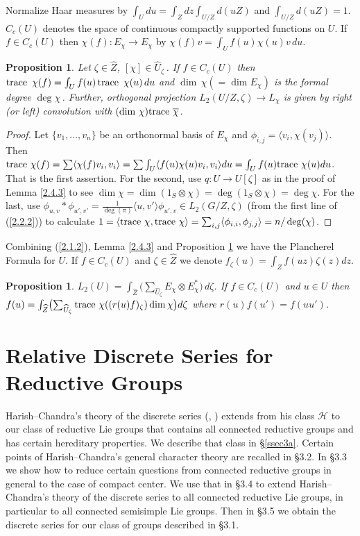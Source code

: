 \documentclass{conm-p-l}
\newtheorem{proposition}[equation]{Proposition}
\def\trace{{\rm trace\,\,}}
\def\cH{\mathcal{H}}
\begin{document}
Normalize Haar measures by
$\int_U du = \int_Z dz\int_{U/Z}d(uZ)$ and $\int_{U/Z} d(uZ) = 1$.
$C_c(U)$ denotes the space of continuous compactly supported functions on $U$.
If $f \in C_c(U)$ then $\chi(f):E_\chi \to E_\chi$ by
$\chi(f)v = \int_U f(u)\chi(u)v\, du$.  

\begin{proposition}\label{2.4.4}
Let $\zeta \in \widehat{Z}$, $[\chi] \in \widehat{U}_\zeta$\,.  If
$f \in C_c(U)$ then 
$\trace\,\chi(f) = \int_U f(u)\, \trace\,\chi(u)\,du$
and $\dim\,\chi (= \dim E_\chi)$ is the formal degree $\deg \chi$\,.
Further, orthogonal projection $L_2(U/Z,\zeta) \to L_\chi$ is given by right
(or left) convolution with $(\dim\,\chi)\trace\overline{\chi}$.
\end{proposition}
\begin{proof} Let $\{v_1,\dots,v_n\}$ be an orthonormal basis of $E_\chi$
and $\phi_{i,j} = \langle v_i,\chi(v_j)\rangle$.  Then $\trace \chi(f)
=\sum\langle \chi(f)v_i,v_i\rangle 
= \sum\int_U\langle f(u)\chi(u)v_i,v_i\rangle du 
= \int_U f(u)\trace \chi(u) du$.  That is the first assertion.  For the
second, use $q:U \to U[\zeta]$ as in the proof of Lemma \ref{2.4.3} to
see $\dim\chi = \dim(1_S\otimes\chi) = \deg(1_S\otimes\chi) = \deg\chi$.
For the last, use $\phi_{u,v}*\phi_{u',v'} = \frac{1}{\deg(\pi)}
\langle u, v' \rangle \phi_{u',v} \in L_2(G/Z,\zeta)$ (from the first line 
of (\ref{2.2.2})) to calculate $1 = \langle \trace\chi,\trace\chi\rangle
= \sum_{i,j}\langle \phi_{i,i}, \phi_{j,j}\rangle = n/\deg(\chi)$.
\end{proof}

Combining (\ref{2.1.2}), Lemma \ref{2.4.3} and Proposition \ref{2.4.4} we have
the Plancherel Formula for $U$.  If $f \in C_c(U)$ and $\zeta \in \widehat{Z}$
we denote $f_\zeta(u) = \int_Z f(uz)\zeta(z)dz$.

\begin{proposition}\label{2.4.5}
$L_2(U) = \int_{\widehat{Z}} \bigl ( \sum_{\widehat{U}_\zeta}
E_\chi \otimes E_\chi^* \bigr )\,d\zeta$.  If $f \in C_c(U)$ and $u \in U$
then $f(u) = \int_{\widehat{Z}} \bigl ( \sum_{\widehat{U}_\zeta}
\trace \chi((r(u)f)_\zeta) \dim\chi\bigr )d\zeta$ where $r(u)f(u') = f(uu')$.
\end{proposition}

\section{Relative Discrete Series for Reductive Groups}\label{sec3}
\setcounter{equation}{0}
Harish--Chandra's theory of the discrete series (\cite{HC1965}, \cite{HC1966})
extends from his class $\cH$ to our class of reductive Lie groups that 
contains all connected reductive groups and has certain hereditary properties.
We describe that class in \S \ref{ssec3a}.  Certain points of Harish--Chandra's
general character theory are recalled in \S 3.2.  In \S 3.3 we show how
to reduce certain questions from connected reductive groups in general to
the case of compact center.  We use that in \S 3.4 to extend Harish--Chandra's
theory of the discrete series to all connected reductive Lie groups, in
particular to all connected semisimple Lie groups.  Then in \S 3.5 we obtain 
the discrete series for our class of groups described in \S 3.1.
\end{document}
